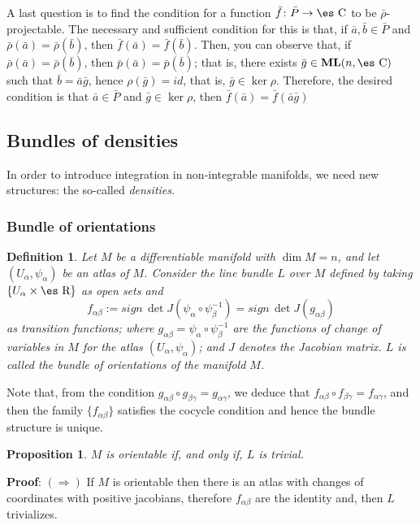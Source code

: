 \documentclass[12pt]{article}
\newtheorem{prop}{Proposition}
\newtheorem{definition}{Definition}
\def\ML{{\bf ML}(n,\Complex )}
\def\Real{\mbox{\es R}}
\def\Complex{\mbox{\es C}}
\begin{document}
A last question is to find the condition for a function $\bar f\colon
\bar P \to \Complex$
to be $\bar \rho$-projectable.
 The necessary and sufficient condition for this is that, if
 $\bar a,\bar b \in \bar P$ and
 $\bar \rho (\bar a) = \bar \rho (\bar b)$,
 then $\bar f(\bar a) = \bar f(\bar b)$.
Then, you can observe that, if $\bar \rho (\bar a) = \bar \rho (\bar
b)$,
then $\bar p (\bar a) = \bar p (\bar b)$; that is, there exists
$\bar g \in \ML$ such that $\bar b = \bar a \bar g$,
hence $\rho(\bar g) = id$, that is, $\bar g \in \ker \rho$.
Therefore, the desired condition is that $\bar a \in \bar P$ and
$\bar g \in \ker \rho$, then $\bar f(\bar a) = \bar f(\bar a \bar g)$



\subsection{Bundles of densities}


In order to introduce integration in non-integrable manifolds, we need
new
structures: the so-called {\it densities}.


\subsubsection{Bundle of orientations}


\begin{definition}
Let $M$ be a differentiable manifold with $\dim M = n$,
and let $(U_{\alpha},\psi_{\alpha})$ be an atlas of $M$.
Consider the line bundle $L$ over $M$ defined by taking
$\{ U_{\alpha} \times \Real \}$ as open sets and
$$
f_{\alpha \beta} :=
sign\, \det J(\psi_{\alpha} \circ \psi_{\beta}^{-1})=
sign\, \det J(g_{\alpha \beta})
$$
as transition functions; where $g_{\alpha \beta} = \psi_{\alpha} \circ
\psi_{\beta}^{-1}$
are the functions of change of variables in $M$ for the atlas
$(U_{\alpha},\psi_{\alpha})$; and $J$ denotes the Jacobian matrix.
$L$ is called the {\rm bundle of orientations} of the manifold $M$.
\label{fo}
\end {definition}

Note that, from the condition
$g_{\alpha \beta} \circ g_{\beta \gamma} = g_{\alpha \gamma}$,
we deduce that $f_{\alpha \beta} \circ f_{\beta \gamma} = f_{\alpha
\gamma}$,
and then the family $\{ f_{\alpha \beta} \}$ satisfies the cocycle
condition and hence
the bundle structure is unique.

\begin{prop}
$M$ is orientable if, and only if, $L$ is trivial.
\label{jusfo}
\end{prop}
{\bf Proof}: 
$(\Longrightarrow)$ \quad
If $M$ is orientable then there is an atlas with changes of coordinates
with positive jacobians,
therefore $f_{\alpha \beta}$ are the identity and, then $L$ trivializes.
\end{document}
